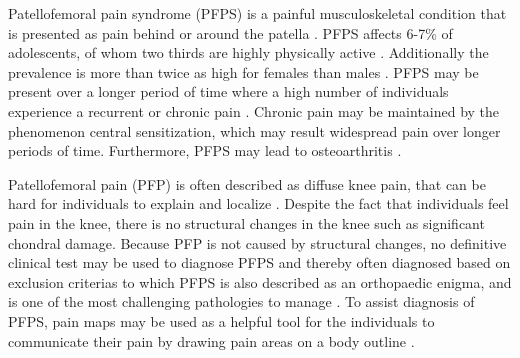 Patellofemoral pain syndrome (PFPS) is a painful musculoskeletal condition that is presented as pain behind or around the patella \citep{Maclachlan2017, Smith2015}. PFPS affects 6-7\% of adolescents, of whom two thirds are highly physically active \citep{Rathleff2015}. Additionally the prevalence is more than twice as high for females than males \citep{Rathleff2015, Petersen2013}.
PFPS may be present over a longer period of time where a high number of individuals experience a recurrent or chronic pain \citep{Witvrouw2014}. Chronic pain may be maintained by the phenomenon central sensitization, which may result widespread pain over longer periods of time. Furthermore, PFPS may lead to osteoarthritis \citep{Petersen2013, Crossley2016}. 

\noindent
Patellofemoral pain (PFP) is often described as diffuse knee pain, that can be hard for individuals to explain and localize \citep{Witvrouw2014}. Despite the fact that individuals feel pain in the knee, there is no structural changes in the knee such as significant chondral damage. Because PFP is not caused by structural changes, no definitive clinical test may be used to diagnose PFPS and thereby often diagnosed based on exclusion criterias \citep{Petersen2013} to which PFPS is also described as an orthopaedic enigma, and is one of the most challenging pathologies to manage \citep{Dye2001}.
To assist diagnosis of PFPS, pain maps may be used as a helpful tool for the individuals to communicate their pain by drawing pain areas on a body outline \citep{Boudreau2016}.

